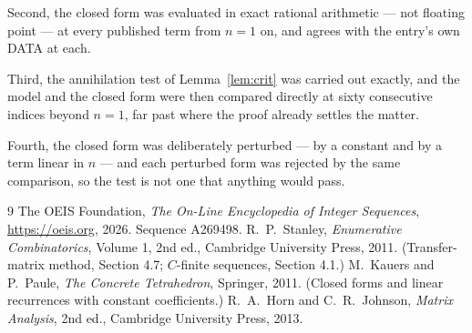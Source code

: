 \documentclass[11pt,a4paper]{article}
\theoremstyle{plain}
\theoremstyle{definition}
\begin{document}
Second, the closed form was evaluated in exact rational arithmetic --- not floating point ---
at every published term from $n=1$ on, and agrees with the entry's own DATA at each.

Third, the annihilation test of Lemma~\ref{lem:crit} was carried out exactly, and the model
and the closed form were then compared directly at sixty consecutive indices beyond
$n=1$, far past where the proof already settles the matter.

Fourth, the closed form was deliberately perturbed --- by a constant and by a term linear in
$n$ --- and each perturbed form was rejected by the same comparison, so the test is not one
that anything would pass.

\begin{thebibliography}{9}
 The OEIS Foundation, \emph{The On-Line Encyclopedia of Integer
Sequences}, \url{https://oeis.org}, 2026. Sequence A269498.
 R.~P.~Stanley, \emph{Enumerative Combinatorics}, Volume 1, 2nd ed.,
Cambridge University Press, 2011. (Transfer-matrix method, Section 4.7; $C$-finite sequences,
Section 4.1.)
 M.~Kauers and P.~Paule, \emph{The Concrete Tetrahedron}, Springer, 2011.
(Closed forms and linear recurrences with constant coefficients.)
 R.~A.~Horn and C.~R.~Johnson, \emph{Matrix Analysis}, 2nd ed., Cambridge
University Press, 2013.
\end{thebibliography}
\end{document}
